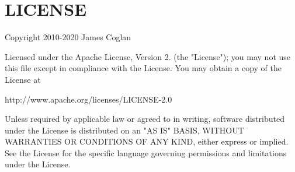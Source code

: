 \chapter{LICENSE }
\hypertarget{md__c_1_2_users_2saket_2_one_drive_2_desktop_2e_pathshala_2epathshala-_web_2node__modules_2websocket-driver_2_l_i_c_e_n_s_e}{}\label{md__c_1_2_users_2saket_2_one_drive_2_desktop_2e_pathshala_2epathshala-_web_2node__modules_2websocket-driver_2_l_i_c_e_n_s_e}
Copyright 2010-\/2020 James Coglan

Licensed under the Apache License, Version 2. (the "{}\+License"{}); you may not use this file except in compliance with the License. You may obtain a copy of the License at \begin{DoxyVerb}http://www.apache.org/licenses/LICENSE-2.0
\end{DoxyVerb}


Unless required by applicable law or agreed to in writing, software distributed under the License is distributed on an "{}\+AS IS"{} BASIS, WITHOUT WARRANTIES OR CONDITIONS OF ANY KIND, either express or implied. See the License for the specific language governing permissions and limitations under the License. 